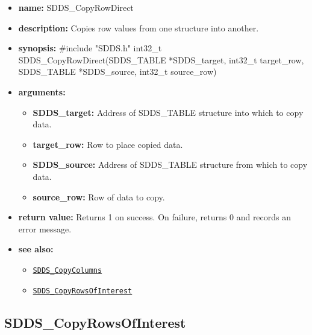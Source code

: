 \documentclass[11pt]{article}
\newcommand{\progref}[1]{\hyperref[SDDS_#1]{\tt SDDS\_#1}}
\begin{document}
\begin{itemize}
\item {\bf name:}\newline
SDDS\_CopyRowDirect
\item {\bf description:}\newline
Copies row values from one structure into another.
\item {\bf synopsis:} \#include "SDDS.h"\newline
int32\_t SDDS\_CopyRowDirect(SDDS\_TABLE *SDDS\_target, int32\_t target\_row, SDDS\_TABLE *SDDS\_source, int32\_t source\_row)
\item {\bf arguments:}
\begin{itemize}
\item {\bf SDDS\_target:} Address of SDDS\_TABLE structure into which to copy data.
\item {\bf target\_row:} Row to place copied data.
\item {\bf SDDS\_source:} Address of SDDS\_TABLE structure from which to copy data.
\item {\bf source\_row:} Row of data to copy.
\end{itemize}
\item {\bf return value:}\newline
Returns 1 on success. On failure, returns 0 and records an error message.
\item {\bf see also:}
\begin{itemize}
\item \progref{CopyColumns}
\item \progref{CopyRowsOfInterest}
\end{itemize}
\end{itemize}

\subsection{SDDS\_CopyRowsOfInterest}
\label{SDDS_CopyRowsOfInterest}
\end{document}
